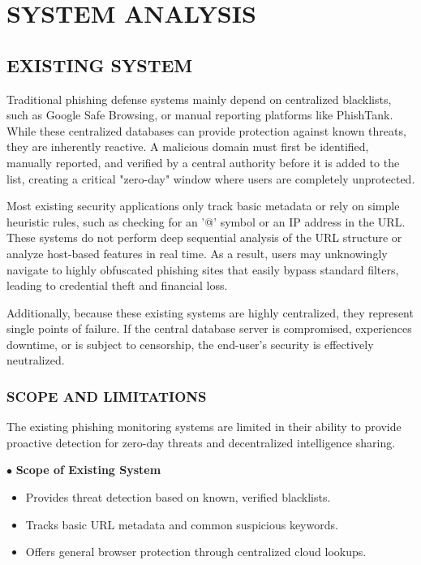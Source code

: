 

\chapter{SYSTEM ANALYSIS}

\section{EXISTING SYSTEM}

Traditional phishing defense systems mainly depend on centralized blacklists, such as Google Safe Browsing, or manual reporting platforms like PhishTank. While these centralized databases can provide protection against known threats, they are inherently reactive. A malicious domain must first be identified, manually reported, and verified by a central authority before it is added to the list, creating a critical "zero-day" window where users are completely unprotected.

Most existing security applications only track basic metadata or rely on simple heuristic rules, such as checking for an '@' symbol or an IP address in the URL. These systems do not perform deep sequential analysis of the URL structure or analyze host-based features in real time. As a result, users may unknowingly navigate to highly obfuscated phishing sites that easily bypass standard filters, leading to credential theft and financial loss.

Additionally, because these existing systems are highly centralized, they represent single points of failure. If the central database server is compromised, experiences downtime, or is subject to censorship, the end-user's security is effectively neutralized.

\subsection{SCOPE AND LIMITATIONS}

The existing phishing monitoring systems are limited in their ability to provide proactive detection for zero-day threats and decentralized intelligence sharing.

\noindent $\bullet$ \textbf{Scope of Existing System}

\begin{itemize}[label=*]
\item Provides threat detection based on known, verified blacklists.
\item Tracks basic URL metadata and common suspicious keywords.
\item Offers general browser protection through centralized cloud lookups.
\end{itemize}


